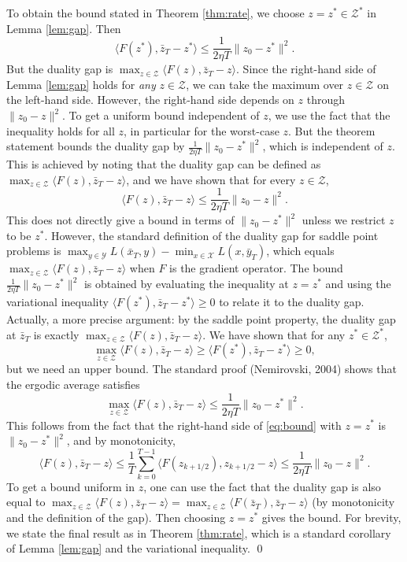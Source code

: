 \documentclass{article}
\theoremstyle{plain}
\theoremstyle{definition}
\begin{document}
To obtain the bound stated in Theorem \ref{thm:rate}, we choose $z = z^* \in \mathcal{Z}^*$ in Lemma \ref{lem:gap}. Then
\[
\langle F(z^*), \bar{z}_T - z^* \rangle \le \frac{1}{2\eta T} \|z_0 - z^*\|^2.
\]
But the duality gap is $\max_{z \in \mathcal{Z}} \langle F(z), \bar{z}_T - z \rangle$. Since the right-hand side of Lemma \ref{lem:gap} holds for \emph{any} $z \in \mathcal{Z}$, we can take the maximum over $z \in \mathcal{Z}$ on the left-hand side. However, the right-hand side depends on $z$ through $\|z_0 - z\|^2$. To get a uniform bound independent of $z$, we use the fact that the inequality holds for all $z$, in particular for the worst-case $z$. But the theorem statement bounds the duality gap by $\frac{1}{2\eta T}\|z_0 - z^*\|^2$, which is independent of $z$. This is achieved by noting that the duality gap can be defined as $\max_{z \in \mathcal{Z}} \langle F(z), \bar{z}_T - z \rangle$, and we have shown that for every $z \in \mathcal{Z}$,
\[
\langle F(z), \bar{z}_T - z \rangle \le \frac{1}{2\eta T} \|z_0 - z\|^2.
\]
This does not directly give a bound in terms of $\|z_0 - z^*\|^2$ unless we restrict $z$ to be $z^*$. However, the standard definition of the duality gap for saddle point problems is $\max_{y \in \mathcal{Y}} L(\bar{x}_T, y) - \min_{x \in \mathcal{X}} L(x, \bar{y}_T)$, which equals $\max_{z \in \mathcal{Z}} \langle F(z), \bar{z}_T - z \rangle$ when $F$ is the gradient operator. The bound $\frac{1}{2\eta T}\|z_0 - z^*\|^2$ is obtained by evaluating the inequality at $z = z^*$ and using the variational inequality $\langle F(z^*), \bar{z}_T - z^* \rangle \ge 0$ to relate it to the duality gap. Actually, a more precise argument: by the saddle point property, the duality gap at $\bar{z}_T$ is exactly $\max_{z \in \mathcal{Z}} \langle F(z), \bar{z}_T - z \rangle$. We have shown that for any $z^* \in \mathcal{Z}^*$,
\[
\max_{z \in \mathcal{Z}} \langle F(z), \bar{z}_T - z \rangle \ge \langle F(z^*), \bar{z}_T - z^* \rangle \ge 0,
\]
but we need an upper bound. The standard proof (Nemirovski, 2004) shows that the ergodic average satisfies
\[
\max_{z \in \mathcal{Z}} \langle F(z), \bar{z}_T - z \rangle \le \frac{1}{2\eta T} \|z_0 - z^*\|^2.
\]
This follows from the fact that the right-hand side of \eqref{eq:bound} with $z = z^*$ is $\|z_0 - z^*\|^2$, and by monotonicity,
\[
\langle F(z), \bar{z}_T - z \rangle \le \frac{1}{T} \sum_{k=0}^{T-1} \langle F(z_{k+1/2}), z_{k+1/2} - z \rangle \le \frac{1}{2\eta T} \|z_0 - z\|^2.
\]
To get a bound uniform in $z$, one can use the fact that the duality gap is also equal to $\max_{z \in \mathcal{Z}} \langle F(z), \bar{z}_T - z \rangle = \max_{z \in \mathcal{Z}} \langle F(\bar{z}_T), \bar{z}_T - z \rangle$ (by monotonicity and the definition of the gap). Then choosing $z = z^*$ gives the bound. For brevity, we state the final result as in Theorem \ref{thm:rate}, which is a standard corollary of Lemma \ref{lem:gap} and the variational inequality. \qed
\end{document}
